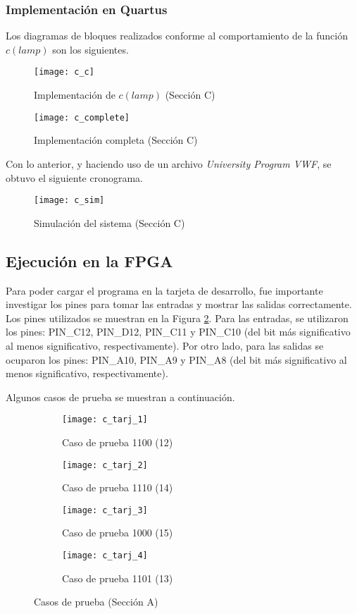 \documentclass[../procedimientos.tex]{subfiles}
\begin{document}
\subsubsection{Implementación en Quartus}
Los diagramas de bloques realizados conforme al comportamiento de la función 
$c(lamp)$ son los siguientes.
\begin{figure}[H]
  \centering
  \texttt{[image: c\_c]}
  \caption{Implementación de $c(lamp)$ (Sección C)}
  \label{fig:c_c}
\end{figure}
\begin{figure}[H]
  \centering
  \texttt{[image: c\_complete]}
  \caption{Implementación completa (Sección C)}
  \label{fig:c_complete}
\end{figure}

Con lo anterior, y haciendo uso de un archivo \textit{University Program VWF}, 
se obtuvo el siguiente cronograma.
\begin{figure}[H]
  \centering
  \texttt{[image: c\_sim]}
  \caption{Simulación del sistema (Sección C)}
  \label{fig:c_sim}
\end{figure}

\subsection{Ejecución en la FPGA}
Para poder cargar el programa en la tarjeta de desarrollo, fue importante 
investigar los pines para tomar las entradas y mostrar las salidas 
correctamente. Los pines utilizados se muestran en la Figura 
\ref{fig:c_complete}. Para las entradas, se utilizaron los pines: PIN\_C12, 
PIN\_D12, PIN\_C11 y PIN\_C10 (del bit más significativo al menos 
significativo, respectivamente). Por otro lado, para las salidas se ocuparon 
los pines: PIN\_A10, PIN\_A9 y PIN\_A8 (del bit más significativo al menos 
significativo, respectivamente).

Algunos casos de prueba se muestran a continuación.
\begin{figure}[H]
  \centering
  \begin{subfigure}[b]{0.45\textwidth}
    \centering
    \caption{Caso de prueba 1100 (12)}
    \label{fig:c_tarj_1}
    \texttt{[image: c\_tarj\_1]}
  \end{subfigure}
  \begin{subfigure}[b]{0.45\textwidth}
    \centering
    \caption{Caso de prueba 1110 (14)}
    \label{fig:c_tarj_2}
    \texttt{[image: c\_tarj\_2]}
  \end{subfigure}
  \begin{subfigure}[b]{0.45\textwidth}
    \centering
    \caption{Caso de prueba 1000 (15)}
    \label{fig:c_tarj_3}
    \texttt{[image: c\_tarj\_3]}
  \end{subfigure}
  \begin{subfigure}[b]{0.45\textwidth}
    \centering
    \caption{Caso de prueba 1101 (13)}
    \label{fig:c_tarj_4}
    \texttt{[image: c\_tarj\_4]}
  \end{subfigure}
  \caption{Casos de prueba (Sección A)}
\end{figure}
\end{document}
